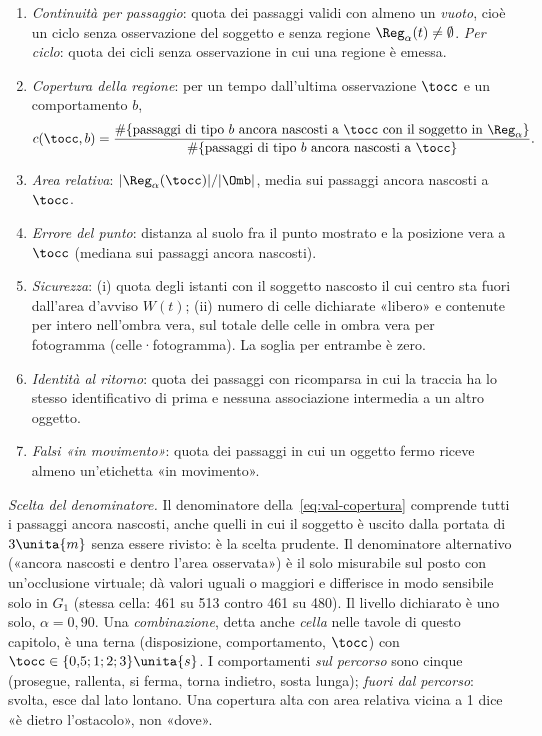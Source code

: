 \begin{definizione}[Misure]\label{def:val-misure}
\begin{enumerate}[label=(\alph*),itemsep=0pt]
\item \emph{Continuità per passaggio}: quota dei passaggi validi con almeno un \emph{vuoto}, cioè un ciclo senza osservazione del soggetto e senza regione $\Reg_\alpha(t)\neq\emptyset$. \emph{Per ciclo}: quota dei cicli senza osservazione in cui una regione è emessa.
\item \emph{Copertura della regione}: per un tempo dall'ultima osservazione $\tocc$ e un comportamento $b$,
\begin{equation}\label{eq:val-copertura}
c(\tocc,b)=\frac{\#\{\text{passaggi di tipo } b \text{ ancora nascosti a } \tocc \text{ con il soggetto in } \Reg_\alpha\}}{\#\{\text{passaggi di tipo } b \text{ ancora nascosti a } \tocc\}} .
\end{equation}
\item \emph{Area relativa}: $|\Reg_\alpha(\tocc)|/|\Omb|$, media sui passaggi ancora nascosti a $\tocc$.
\item \emph{Errore del punto}: distanza al suolo fra il punto mostrato e la posizione vera a $\tocc$ (mediana sui passaggi ancora nascosti).
\item \emph{Sicurezza}: (i) quota degli istanti con il soggetto nascosto il cui centro sta fuori dall'area d'avviso $W(t)$; (ii) numero di celle dichiarate «libero» e contenute per intero nell'ombra vera, sul totale delle celle in ombra vera per fotogramma (celle·fotogramma). La soglia per entrambe è zero.
\item \emph{Identità al ritorno}: quota dei passaggi con ricomparsa in cui la traccia ha lo stesso identificativo di prima e nessuna associazione intermedia a un altro oggetto.
\item \emph{Falsi «in movimento»}: quota dei passaggi in cui un oggetto fermo riceve almeno un'etichetta «in movimento».
\end{enumerate}
\end{definizione}

\emph{Scelta del denominatore.} Il denominatore della~\eqref{eq:val-copertura} comprende tutti i passaggi ancora nascosti, anche quelli in cui il soggetto è uscito dalla portata di $3\unita{m}$ senza essere rivisto: è la scelta prudente. Il denominatore alternativo («ancora nascosti e dentro l'area osservata») è il solo misurabile sul posto con un'occlusione virtuale; dà valori uguali o maggiori e differisce in modo sensibile solo in $G_1$ (stessa cella: 461 su 513 contro 461 su 480). Il livello dichiarato è uno solo, $\alpha=0{,}90$. Una \emph{combinazione}, detta anche \emph{cella} nelle tavole di questo capitolo, è una terna (disposizione, comportamento, $\tocc$) con $\tocc\in\{0{,}5;1;2;3\}\unita{s}$. I comportamenti \emph{sul percorso} sono cinque (prosegue, rallenta, si ferma, torna indietro, sosta lunga); \emph{fuori dal percorso}: svolta, esce dal lato lontano. Una copertura alta con area relativa vicina a 1 dice «è dietro l'ostacolo», non «dove».


